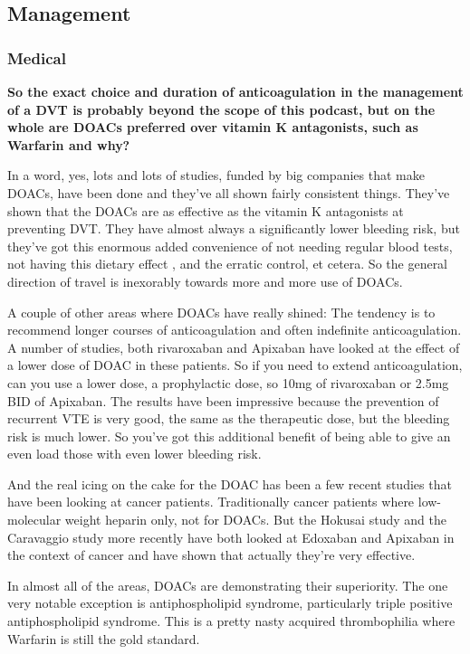 \documentclass[
]{book}
\begin{document}
\hypertarget{management-30}{%
\subsection{Management}\label{management-30}}

\hypertarget{medical}{%
\subsubsection{Medical}\label{medical}}

\textbf{So the exact choice and duration of anticoagulation in the management
of a DVT is probably beyond the scope of this podcast, but on the whole
are DOACs preferred over vitamin K antagonists, such as Warfarin and
why?}

In a word, yes, lots and lots of studies, funded by big companies that
make DOACs, have been done and they've all shown fairly consistent
things. They've shown that the DOACs are as effective as the vitamin K
antagonists at preventing DVT. They have almost always a significantly
lower bleeding risk, but they've got this enormous added convenience of
not needing regular blood tests, not having this dietary effect , and
the erratic control, et cetera. So the general direction of travel is
inexorably towards more and more use of DOACs.

A couple of other areas where DOACs have really shined: The tendency is
to recommend longer courses of anticoagulation and often indefinite
anticoagulation. A number of studies, both rivaroxaban and Apixaban have
looked at the effect of a lower dose of DOAC in these patients. So if
you need to extend anticoagulation, can you use a lower dose, a
prophylactic dose, so 10mg of rivaroxaban or 2.5mg BID of Apixaban. The
results have been impressive because the prevention of recurrent VTE is
very good, the same as the therapeutic dose, but the bleeding risk is
much lower. So you've got this additional benefit of being able to give
an even load those with even lower bleeding risk.

And the real icing on the cake for the DOAC has been a few recent
studies that have been looking at cancer patients. Traditionally cancer
patients where low-molecular weight heparin only, not for DOACs. But the
Hokusai study\citep{raskob2018} and the Caravaggio study\citep{agnelli2020} more
recently have both looked at Edoxaban and Apixaban in the context of
cancer and have shown that actually they're very effective.

In almost all of the areas, DOACs are demonstrating their superiority.
The one very notable exception is antiphospholipid syndrome,
particularly triple positive antiphospholipid syndrome. This is a pretty
nasty acquired thrombophilia where Warfarin is still the gold
standard.\citep{pengo2018}
\end{document}
